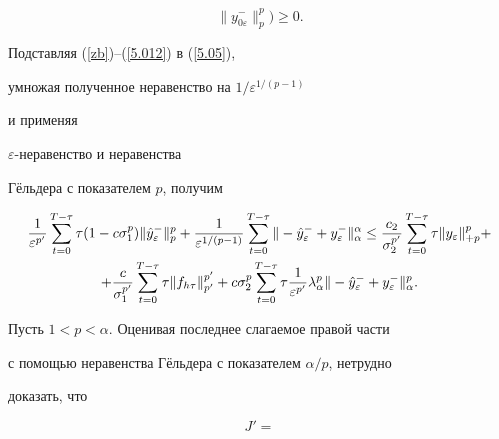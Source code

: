 \begin{pf}
\begin{equation}
\| y_{0\varepsilon}^{-}\|^p_p ) \ge 0. \label{5.012}


\end{equation}


Подставляя (\ref{zb})--(\ref{5.012})   в  (\ref{5.05}),


умножая полученное неравенство на $1/{\varepsilon^{1/(p-1)}}$


и применяя


$\varepsilon$-неравенство и неравенства


Г\"ельдера с показателем $p$, получим


\begin{gather}


\frac{1}{\varepsilon^{p'}}


\sum^{T-\tau}_{t=0}\tau


(1-c\sigma_1^p)


\| \Hat{y}_\varepsilon^{-}\|^{p}_p+


\frac{1}{\varepsilon^{1/(p-1)}}


\sum^{T-\tau}_{t=0} \|


-\Hat{y}_\varepsilon^{-} + y_\varepsilon^{-}


 \|^\alpha_\alpha  \le


 \frac{c_2}{\sigma_2^{p'}} \sum^{T-\tau}_{t=0}\tau


 \| y_\varepsilon \|_{+p}^{p} +\notag\\


%


+ \frac{c}{\sigma_1^{p'}}


 \sum^{T-\tau}_{t=0}\tau \| f_{h\tau}


 \|_{p'}^{p'} +


c\sigma_2^p \sum^{T-\tau}_{t=0}\tau


\frac{1}{\varepsilon^{p'}} \lambda^p_\alpha


\|


-\Hat{y}_\varepsilon^{-} + y_\varepsilon^{-}


 \|^p_\alpha.\label{5.014}


\end{gather}


Пусть $1 < p < \alpha .$ Оценивая последнее слагаемое правой части


с помощью неравенства Г\"ельдера с показателем $\alpha/p$, нетрудно


доказать, что


\begin{equation}


J' =



\end{equation}
\end{pf}
